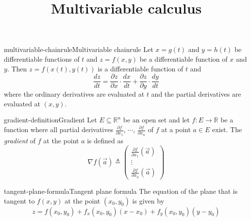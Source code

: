 \documentclass[preview]{standalone}
\begin{document}
\title{Multivariable calculus}
\genpage

\begin{snippettheorem}{multivariable-chainrule}{Multivariable chainrule}
    Let \(x=g(t)\) and \(y=h(t)\) be differentiable functions of \(t\)
    and \(z=f(x,y)\) be a differentiable function of \(x\) and \(y\).
    Then \(z=f(x(t), y(t))\) is a differentiable function of \(t\) and
    \[
        \frac{dz}{dt} =
        \frac{\partial z}{\partial x} \cdot \frac{dx}{dt} +
        \frac{\partial z}{\partial y} \cdot \frac{dy}{dt}
    \]
    where the ordinary derivatives are evaluated at \(t\) and the partial
    derivatives are evaluated at \((x,y)\).
\end{snippettheorem}

\begin{snippetdefinition}{gradient-definition}{Gradient}
    Let \(E \subseteq {\mathbb{R}}^n\) be an open set and
    let \(f\colon E \to \mathbb{R}\) be a function where
    all partial derivatives \(\frac{\partial f}{\partial x_1}\),
    \(\cdots\), \(\frac{\partial f}{\partial x_n}\) of \(f\)
    at a point \(a\in E\) exist.
    The \textit{gradient} of \(f\) at the point \(a\)
    is defined as
    \[
        \nabla f(\vec{a}) \triangleq
        \left(\begin{array}{c}
        \frac{\partial f}{\partial x_1}(\vec{a}) \\
        \vdots \\
        \frac{\partial f}{\partial x_n}(\vec{a})
        \end{array}\right)
    \]
\end{snippetdefinition}

\begin{snippetproposition}{tangent-plane-formula}{Tangent plane formula}
    The equation of the plane that is tangent to \(f(x,y)\)
    at the point \((x_0, y_0)\) is given by
    \[
        z = f(x_0, y_0) + f_x(x_0, y_0)(x-x_0) + f_y(x_0, y_0)(y-y_0)
    \]
\end{snippetproposition}
\end{document}
